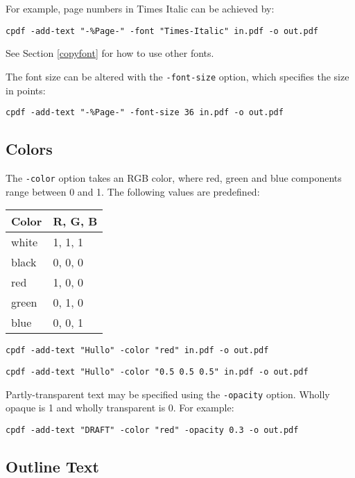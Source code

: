 \documentclass{book}
\begin{document}
  \noindent For example, page numbers in Times Italic can be achieved by:
  \begin{framed}
    \small\verb!cpdf -add-text "-%Page-" -font "Times-Italic" in.pdf -o out.pdf!
  \end{framed}
  \noindent See Section \ref{copyfont} for how to use other fonts.

  The font size can be altered with the \texttt{-font-size} option, which
specifies the size in points:
  \begin{framed}
    \small\verb!cpdf -add-text "-%Page-" -font-size 36 in.pdf -o out.pdf!
  \end{framed}

  \subsection{Colors}
  The \texttt{-color} option takes an RGB color, where red, green and blue
components range between 0 and 1. The following values are predefined:

  \vspace{2mm}
  \begin{tabular}{ll}
    \textbf{Color} & \textbf{R, G, B} \\ \hline
     white & 1, 1, 1\\
     black & 0, 0, 0\\
     red & 1, 0, 0\\
     green & 0, 1, 0\\
     blue & 0, 0, 1\\
  \end{tabular}

  \begin{framed}
    \small\verb!cpdf -add-text "Hullo" -color "red" in.pdf -o out.pdf!
    
    \vspace{1.5mm}
    \small\verb!cpdf -add-text "Hullo" -color "0.5 0.5 0.5" in.pdf -o out.pdf!
  \end{framed}

\noindent Partly-transparent text may be specified using the \verb!-opacity! option. Wholly opaque is 1 and wholly transparent is 0. For example:

\begin{framed}
  \small\verb!cpdf -add-text "DRAFT" -color "red" -opacity 0.3 -o out.pdf!
\end{framed}

\subsection{Outline Text}
\end{document}
